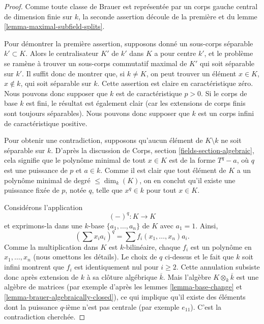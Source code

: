 \begin{proof}
Comme toute classe de Brauer est représentée par un corps gauche central de dimension
finie sur $k$, la seconde assertion découle de la
première et du
lemme \ref{lemma-maximal-subfield-splits}.

\medskip\noindent
Pour démontrer la première assertion, supposons donné un sous-corps séparable
$k' \subset K$. Alors le centralisateur $K'$ de $k'$ dans $K$
a pour centre $k'$, et le problème se ramène à trouver un sous-corps commutatif
maximal de $K'$ qui soit séparable sur $k'$. Il suffit donc de montrer que, si
$k \not = K$, on peut trouver un élément $x \in K$, $x \not \in k$,
qui soit séparable sur $k$. Cette assertion est claire en caractéristique
zéro. Nous pouvons donc supposer que $k$ est de caractéristique $p > 0$. Si le
corps de base $k$ est fini, le résultat est également clair (car les
extensions de corps finis sont toujours séparables). Nous pouvons donc supposer
que $k$ est un corps infini de caractéristique positive.

\medskip\noindent
Pour obtenir une contradiction, supposons qu'aucun élément de $K \setminus k$ ne soit séparable sur $k$.
D'après la discussion de
Corps, section \ref{fields-section-algebraic},
cela signifie que le polynôme minimal de tout $x \in K$ est de la forme
$T^q - a$, où $q$ est une puissance de $p$ et $a \in k$. Comme il est
clair que tout élément de $K$ a un polynôme minimal de degré
$\leq \dim_k(K)$, on en conclut qu'il existe une puissance fixée de $p$, notée
$q$, telle que $x^q \in k$ pour tout $x \in K$.

\medskip\noindent
Considérons l'application
$$
(-)^q : K \longrightarrow K
$$
et exprimons-la dans une $k$-base $\{a_1, \ldots, a_n\}$ de $K$
avec $a_1 = 1$. Ainsi,
$$
(\sum x_i a_i)^q = \sum f_i(x_1, \ldots, x_n)a_i.
$$
Comme la multiplication dans $K$ est $k$-bilinéaire, chaque $f_i$
est un polynôme en $x_1, \ldots, x_n$ (nous omettons les détails).
Le choix de $q$ ci-dessus et le fait que $k$ soit infini montrent que
$f_i$ est identiquement nul pour $i \geq 2$. Cette annulation subsiste donc
après extension de $k$ à sa clôture algébrique $\overline{k}$. Mais
l'algèbre $K \otimes_k \overline{k}$ est une algèbre de matrices (par exemple d'après les
lemmes \ref{lemma-base-change} et \ref{lemma-brauer-algebraically-closed}),
ce qui implique qu'il existe des éléments dont la puissance $q$-ième n'est pas centrale
(par exemple $e_{11}$). C'est la contradiction cherchée.
\end{proof}

